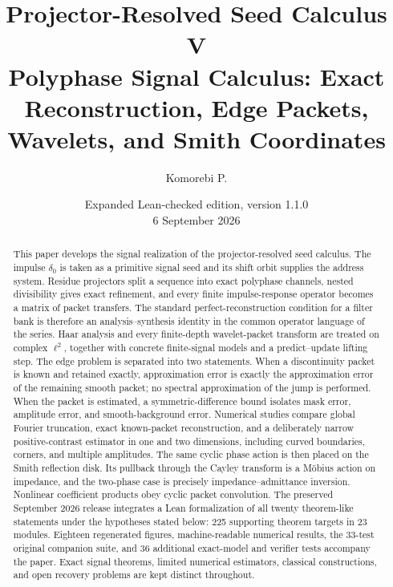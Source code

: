 \documentclass[11pt]{article}
\title{\textbf{Projector-Resolved Seed Calculus V}\\[0.45em]
\large Polyphase Signal Calculus: Exact Reconstruction, Edge Packets, Wavelets, and Smith Coordinates}
\author{Komorebi P.}
\date{Expanded Lean-checked edition, version 1.1.0\\\small 6 September 2026}
\theoremstyle{definition}
\theoremstyle{remark}
\begin{document}
\maketitle

\begin{abstract}
This paper develops the signal realization of the projector-resolved seed calculus. The impulse $\delta_0$ is taken as a primitive signal seed and its shift orbit supplies the address system. Residue projectors split a sequence into exact polyphase channels, nested divisibility gives exact refinement, and every finite impulse-response operator becomes a matrix of packet transfers. The standard perfect-reconstruction condition for a filter bank is therefore an analysis--synthesis identity in the common operator language of the series. Haar analysis and every finite-depth wavelet-packet transform are treated on complex $\ell^2$, together with concrete finite-signal models and a predict--update lifting step. The edge problem is separated into two statements. When a discontinuity packet is known and retained exactly, approximation error is exactly the approximation error of the remaining smooth packet; no spectral approximation of the jump is performed. When the packet is estimated, a symmetric-difference bound isolates mask error, amplitude error, and smooth-background error. Numerical studies compare global Fourier truncation, exact known-packet reconstruction, and a deliberately narrow positive-contrast estimator in one and two dimensions, including curved boundaries, corners, and multiple amplitudes. The same cyclic phase action is then placed on the Smith reflection disk. Its pullback through the Cayley transform is a M\"obius action on impedance, and the two-phase case is precisely impedance--admittance inversion. Nonlinear coefficient products obey cyclic packet convolution. The preserved September 2026 release integrates a Lean formalization of all twenty theorem-like statements under the hypotheses stated below: 225 supporting theorem targets in 23 modules. Eighteen regenerated figures, machine-readable numerical results, the 33-test original companion suite, and 36 additional exact-model and verifier tests accompany the paper. Exact signal theorems, limited numerical estimators, classical constructions, and open recovery problems are kept distinct throughout.
\end{abstract}
\end{document}
